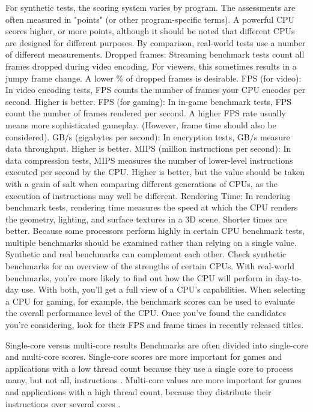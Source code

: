 For synthetic tests, the scoring system varies by program. The assessments are often measured in "points" (or other program-specific terms). A powerful CPU scores higher, or more points, although it should be noted that different CPUs are designed for different purposes.
By comparison, real-world tests use a number of different measurements.
Dropped frames: Streaming benchmark tests count all frames dropped during video encoding. For viewers, this sometimes results in a jumpy frame change. A lower \% of dropped frames is desirable.
FPS (for video): In video encoding tests, FPS counts the number of frames your CPU encodes per second. Higher is better.
FPS (for gaming): In in-game benchmark tests, FPS count the number of frames rendered per second. A higher FPS rate usually means more sophisticated gameplay. (However, frame time should also be considered).
GB/s (gigabytes per second): In encryption tests, GB/s measure data throughput. Higher is better.
MIPS (million instructions per second): In data compression tests, MIPS measures the number of lower-level instructions executed per second by the CPU. Higher is better, but the value should be taken with a grain of salt when comparing different generations of CPUs, as the execution of instructions may well be different.
Rendering Time: In rendering benchmark tests, rendering time measures the speed at which the CPU renders the geometry, lighting, and surface textures in a 3D scene. Shorter times are better.
Because some processors perform highly in certain CPU benchmark tests, multiple benchmarks should be examined rather than relying on a single value.
Synthetic and real benchmarks can complement each other. Check synthetic benchmarks for an overview of the strengths of certain CPUs. With real-world benchmarks, you're more likely to find out how the CPU will perform in day-to-day use. With both, you'll get a full view of a CPU's capabilities.
When selecting a CPU for gaming, for example, the benchmark scores can be used to evaluate the overall performance level of the CPU. Once you've found the candidates you're considering, look for their FPS and frame times in recently released titles.

Single-core versus multi-core results
Benchmarks are often divided into single-core and multi-core scores.
Single-core scores are more important for games and applications with a low thread count because they use a single core to process many, but not all, instructions \cite{Fromsing30:online}.
Multi-core values are more important for games and applications with a high thread count, because they distribute their instructions over several cores \cite{1110353543:online}.

